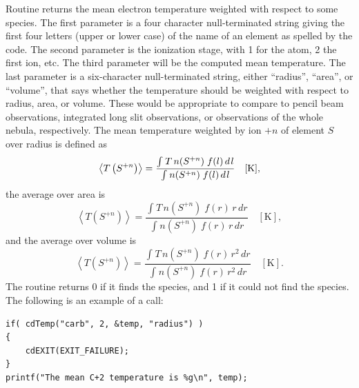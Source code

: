 Routine  returns the mean electron temperature weighted with respect
to some species.
The first parameter is a four character null-terminated
string giving the first four letters (upper or lower case) of the name of
an element as spelled by the code.
The second parameter is the ionization
stage, with 1 for the atom, 2 the first ion, etc.
The third parameter will
be the computed mean temperature.
The last parameter is a six-character
null-terminated string, either ``radius'', ``area'', or ``volume'', that says whether
the temperature should be weighted with respect to radius, area, or volume.
These would be appropriate to compare to pencil beam observations,
integrated long slit observations, or observations of the whole nebula, respectively.
The mean temperature weighted by ion $+n$ of element $S$ over radius
is defined as
\begin{equation}
\left\langle {T\left( {{S^{ + n}}} \right)} \right\rangle  =
\frac{{\int_{}^{} {T\,n({S^{ + n}})\;f(l)\,d{\kern 1pt} l} }}{{\int_{}^{}
{n({S^{ + n}})\;f(l)\,d{\kern 1pt} l} }}\quad [\mathrm{K}],
\end{equation}
the average over area is
\begin{equation}
\left\langle {T\left( {{S^{ + n}}} \right)} \right\rangle  =
\frac{{\int_{}^{} {T\,n({S^{ + n}})\;f(r)\,r\,dr} }}{{\int_{}^{} {n({S^{ +
n}})\;f(r)\,r\,dr} }}
\quad [\mathrm{K}],
\end{equation}
and the average over volume  is
\begin{equation}
\left\langle {T\left( {{S^{ + n}}} \right)} \right\rangle  =
\frac{{\int_{}^{} {T\,n({S^{ + n}})\;f(r)\,r^2\,dr} }}{{\int_{}^{} {n({S^{ +
n}})\;f(r)\,r^2\,dr} }}
\quad [\mathrm{K}] .
\end{equation}
The routine returns 0 if it finds the species, and 1 if it could not find
the species.  The following is an example of a call:
\begin{verbatim}
if( cdTemp("carb", 2, &temp, "radius") )
{
    cdEXIT(EXIT_FAILURE);
}
printf("The mean C+2 temperature is %g\n", temp);
\end{verbatim}

